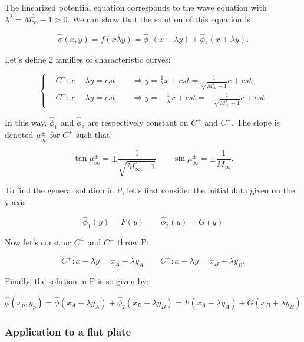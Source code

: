 	The linearized potential equation corresponds to the wave equation with $\lambda ^2 = M_\infty ^2 -1 >0$. We can show that the solution of this equation is 
	
	\begin{equation}
	\hat{\phi}(x,y)= f(x\lambda y) = \hat{\phi} _{1}(x-\lambda y) + \hat{\phi} _{2} (x+\lambda y).
	\end{equation}		
	
	Let's define 2 families of characteristic curves:
	
	\begin{equation}
	\left\{
	\begin{aligned}
	&C^+ : x-\lambda y = cst \qquad \Rightarrow y = \frac{1}{\lambda} x + cst = \frac{1}{\sqrt{M_\infty ^2 -1}} c + cst\\
	&C^+ : x+\lambda y = cst \qquad \Rightarrow y = -\frac{1}{\lambda} x + cst = -\frac{1}{\sqrt{M_\infty ^2 -1}} c + cst
	\end{aligned}
	\right.
	\end{equation}
	
	In this way, $\hat{\phi} _1$ and $\hat{\phi} _2$ are respectively constant on $C^+$ and $C^-$. The slope is denoted $\mu _\infty ^\pm$ for $C^\pm$ such that: 
	
	\begin{equation}
	\tan \mu _\infty ^\pm = \pm \frac{1}{\sqrt{M_\infty ^2 -1}} \qquad \sin \mu _\infty ^\pm = \pm \frac{1}{M_\infty}.
	\end{equation}
	
	To find the general solution in P, let's first consider the initial data given on the y-axis: 
	
	\begin{equation}
	\hat{\phi} _1(y) = F(y)\qquad \hat{\phi}_2 (y) = G(y)
	\end{equation}
	
	Now let's construc $C^+$ and $C^-$ throw P: 
	
	\begin{equation}
	C^+ : x-\lambda y = x_A - \lambda y_A\qquad C^- : x-\lambda y = x_B + \lambda y_B.
	\end{equation}
	
	Finally, the solution in P is so given by:
	
	\begin{equation}
	\hat{ \phi} (x_p,y_p) = \hat{\phi} (x_A - \lambda y_A) + \hat{\phi} _2 (x_B + \lambda y_B) = F (x_A - \lambda y_A) + G (x_B + \lambda y_B)
	\end{equation}
	
\subsubsection{Application to a flat plate}
	